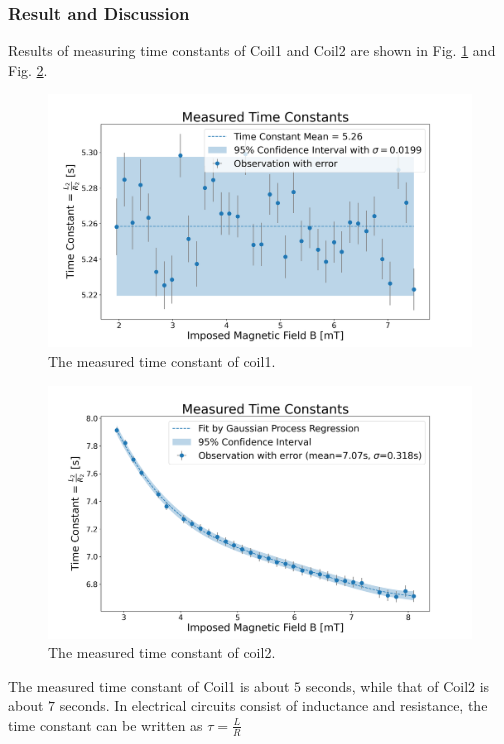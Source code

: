 \subsubsection{Result and Discussion}
Results of measuring time constants of Coil1 and Coil2 are shown in Fig. \ref{fig:Coil1TimeConstant} and Fig. \ref{fig:Coil2TimeConstant}.
\begin{figure}[H]
  \includegraphics[width=17cm, bb=9 9 900 520]{./section3Effectiveness/Coil1TimeConstant.png}
  \caption{The measured time constant of coil1.}
  \label{fig:Coil1TimeConstant}
\end{figure}
\begin{figure}[H]
  \includegraphics[width=17cm, bb=9 9 900 480]{./section3Effectiveness/Coil2TimeConstant.png}
  \caption{The measured time constant of coil2.}
  \label{fig:Coil2TimeConstant}
\end{figure}
The measured time constant of Coil1 is about $5$ seconds, while that of Coil2 is about $7$ seconds.
In electrical circuits consist of inductance and resistance, the time constant can be written as $\tau = \frac{L}{R}$
